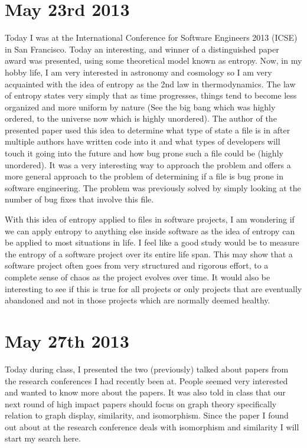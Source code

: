 \documentclass[conference]{IEEEtran}
\begin{document}
\section{May 23rd 2013}
Today I was at the International Conference for Software Engineers 2013 (ICSE)
in San Francisco. Today an interesting, and winner of a distinguished paper
award was presented, using some theoretical model known as entropy. Now,
in my hobby life, I am very interested in astronomy and cosmology so I
am very acquainted with the idea of entropy as the 2nd law in thermodynamics.
The law of entropy states very simply that as time progresses, things tend
to become less organized and more uniform by nature (See the big bang which
was highly ordered, to the universe now which is highly unordered). The 
author of the presented paper used this idea to determine what type of
state a file is in after multiple authors have written code into it and
what types of developers will touch it going into the future and how bug
prone such a file could be (highly unordered). It was a very interesting way
to approach the problem and offers a more general approach to the problem
of determining if a file is bug prone in software engineering. The problem
was previously solved by simply looking at the number of bug fixes that
involve this file. 

With this idea of entropy applied to files in software projects, I am 
wondering if we can apply entropy to anything else inside software as the
idea of entropy can be applied to most situations in life. I feel like a good
study would be to measure the entropy of a software project over its
entire life span. This may show that a software project often goes from very
structured and rigorous effort, to a complete sense of chaos as the project
evolves over time. It would also be interesting to see if this is true
for all projects or only projects that are eventually abandoned and not 
in those projects which are normally deemed healthy.

\section{May 27th 2013}
Today during class, I presented the two (previously) talked about papers
from the research conferences I had recently been at. People seemed very
interested and wanted to know more about the papers. It was also told in
class that our next round of high impact papers should focus on graph theory
specifically relation to graph display, similarity, and isomorphism. Since
the paper I found out about at the research conference deals with isomorphism
and similarity I will start my search here.
\end{document}
